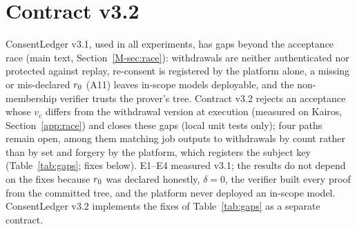 \section{Contract v3.2}
\label{app:v32}
ConsentLedger v3.1, used in all experiments, has gaps beyond the acceptance race (main text, Section~\ref{M-sec:race}): withdrawals are neither authenticated nor protected against replay, re-consent is registered by the platform alone, a missing or mis-declared $r_0$ (A11) leaves in-scope models deployable, and the non-membership verifier trusts the prover's tree. Contract v3.2 rejects an acceptance whose $v_c$ differs from the withdrawal version at execution (measured on Kairos, Section~\ref{app:race}) and closes these gaps (local unit tests only); four paths remain open, among them matching job outputs to withdrawals by count rather than by set and forgery by the platform, which registers the subject key (Table~\ref{tab:gaps}; fixes below). E1--E4 measured v3.1; the results do not depend on the fixes because $r_0$ was declared honestly, $\delta=0$, the verifier built every proof from the committed tree, and the platform never deployed an in-scope model. ConsentLedger v3.2 implements the fixes of Table~\ref{tab:gaps} as a separate contract.


